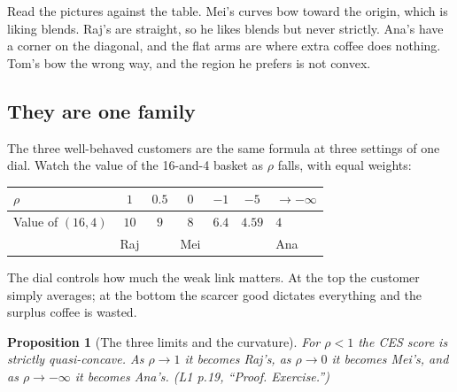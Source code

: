 \documentclass[11pt,letterpaper]{article}
\theoremstyle{definition}
\theoremstyle{plain}
\newtheorem{prop}{Proposition}
\newcommand{\src}[1]{{\small\textsf{(#1)}}}
\begin{document}
Read the pictures against the table. Mei's curves bow toward the origin, which is liking blends. Raj's
are straight, so he likes blends but never strictly. Ana's have a corner on the diagonal, and the
flat arms are where extra coffee does nothing. Tom's bow the wrong way, and the region he prefers is
not convex.

\subsection{They are one family}

The three well-behaved customers are the same formula at three settings of one dial. Watch the value
of the 16-and-4 basket as $\rho$ falls, with equal weights:

\begin{center}
\begin{tabular}{@{}lcccccl@{}}
\toprule
$\rho$ & $1$ & $0.5$ & $0$ & $-1$ & $-5$ & $\to -\infty$ \\
\midrule
Value of $(16,4)$ & $10$ & $9$ & $8$ & $6.4$ & $4.59$ & $4$ \\
& Raj & & Mei & & & Ana \\
\bottomrule
\end{tabular}
\end{center}

The dial controls how much the weak link matters. At the top the customer simply averages; at the
bottom the scarcer good dictates everything and the surplus coffee is wasted.

\begin{prop}[The three limits and the curvature] For $\rho < 1$ the CES score is strictly
quasi-concave. As $\rho \to 1$ it becomes Raj's, as $\rho \to 0$ it becomes Mei's, and as
$\rho \to -\infty$ it becomes Ana's. \src{L1 p.19, ``Proof. Exercise.''}
\end{prop}
\end{document}
